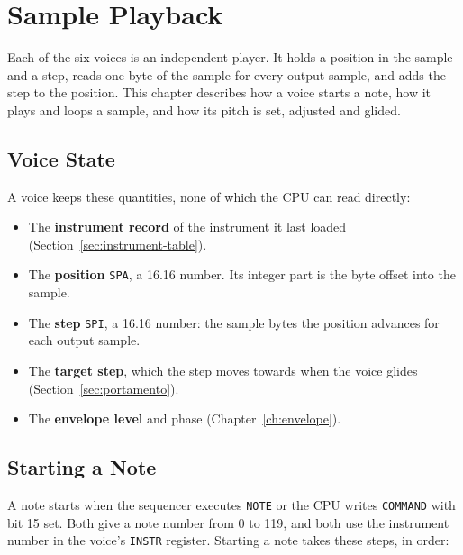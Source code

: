 \chapter{Sample Playback}
\label{ch:playback}

Each of the six voices is an independent player. It holds a position in the sample and a step, reads one byte of the
sample for every output sample, and adds the step to the position. This chapter describes how a voice starts a note,
how it plays and loops a sample, and how its pitch is set, adjusted and glided.

\section{Voice State}

A voice keeps these quantities, none of which the CPU can read directly:

\begin{itemize}
	\item The \textbf{instrument record} of the instrument it last loaded (Section~\ref{sec:instrument-table}).
	\item The \textbf{position} \texttt{SPA}, a 16.16 number. Its integer part is the byte offset into the sample.
	\item The \textbf{step} \texttt{SPI}, a 16.16 number: the sample bytes the position advances for each output sample.
	\item The \textbf{target step}, which the step moves towards when the voice glides (Section~\ref{sec:portamento}).
	\item The \textbf{envelope level} and phase (Chapter~\ref{ch:envelope}).
\end{itemize}

\section{Starting a Note}
\label{sec:note-start}

A note starts when the sequencer executes \texttt{NOTE} or the CPU writes \texttt{COMMAND} with bit 15 set. Both give a
note number from 0 to 119, and both use the instrument number in the voice's \texttt{INSTR} register. Starting a note
takes these steps, in order:

